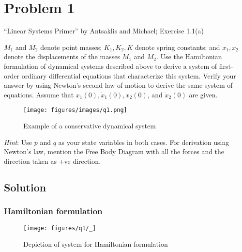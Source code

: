 \section*{Problem 1}

``Linear Systems Primer'' by Antsaklis and Michael;
Exercise 1.1(a)

\(M_1\) and \(M_2\) denote point masses; \(K_1, K_2, K\) denote spring constants; and \(x_1,x_2\) denote the displacements of the masses \(M_1\) and \(M_2\).
Use the Hamiltonian formulation of dynamical systems described above to derive a system of first-order ordinary differential equations that characterize this system.
Verify your answer by using Newton's second law of motion to derive the same system of equations.
Assume that \(x_1(0), \dot x_1(0), x_2(0)\), and \(\dot x_2(0)\) are given.

\begin{figure}[h]
    \centering
    \texttt{[image: figures/images/q1.png]}
    \caption{
        Example of a conservative dynamical system
    }\label{fig:q1}
\end{figure}

\textit{Hint}: Use \(p\) and \(q\) as your state variables in both cases.
For derivation using Newton's law, mention the Free Body Diagram with all the forces and the direction taken as +ve direction.

\clearpage
\subsection*{Solution}

\subsubsection*{Hamiltonian formulation}

\begin{figure}[htb]
    \centering
    \texttt{[image: figures/q1/\_]}
    \caption{
        Depiction of system for Hamiltonian formulation
    }\label{fig:q1-hamiltonian}
\end{figure}

